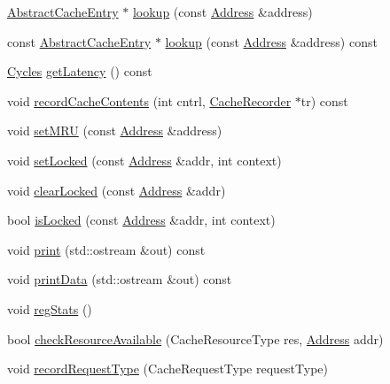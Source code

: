 \begin{DoxyCompactItemize}
\hyperlink{classAbstractCacheEntry}{AbstractCacheEntry} $\ast$ \hyperlink{classCacheMemory_a0c6ae9fa65dfd9c0786e2e5a39be4a1e}{lookup} (const \hyperlink{classAddress}{Address} \&address)
\item 
const \hyperlink{classAbstractCacheEntry}{AbstractCacheEntry} $\ast$ \hyperlink{classCacheMemory_a28b926de4d910367b746eb67d244f250}{lookup} (const \hyperlink{classAddress}{Address} \&address) const 
\item 
\hyperlink{classCycles}{Cycles} \hyperlink{classCacheMemory_ae69a59f28f0cfd099bf798cb6bb76356}{getLatency} () const 
\item 
void \hyperlink{classCacheMemory_aa6672e5328a3421c133ea5590f4b562d}{recordCacheContents} (int cntrl, \hyperlink{classCacheRecorder}{CacheRecorder} $\ast$tr) const 
\item 
void \hyperlink{classCacheMemory_a82f197cef10db015c46d8e9f71275f47}{setMRU} (const \hyperlink{classAddress}{Address} \&address)
\item 
void \hyperlink{classCacheMemory_a046beba265922d99b46eb407d30fa14a}{setLocked} (const \hyperlink{classAddress}{Address} \&addr, int context)
\item 
void \hyperlink{classCacheMemory_abd16aaa7623b6ed38e15bde2b210f88a}{clearLocked} (const \hyperlink{classAddress}{Address} \&addr)
\item 
bool \hyperlink{classCacheMemory_aeb3a7f627af8ca6e8c5f9a878a01ea6f}{isLocked} (const \hyperlink{classAddress}{Address} \&addr, int context)
\item 
void \hyperlink{classCacheMemory_ac55fe386a101fbae38c716067c9966a0}{print} (std::ostream \&out) const 
\item 
void \hyperlink{classCacheMemory_a82b5740a65950cb6ba001dc852567da7}{printData} (std::ostream \&out) const 
\item 
void \hyperlink{classCacheMemory_a4dc637449366fcdfc4e764cdf12d9b11}{regStats} ()
\item 
bool \hyperlink{classCacheMemory_a89094cea0857bcf3a16b429c0b3f8bfe}{checkResourceAvailable} (CacheResourceType res, \hyperlink{classAddress}{Address} addr)
\item 
void \hyperlink{classCacheMemory_a4798ec530ab14c83a290b9d372e31a9d}{recordRequestType} (CacheRequestType requestType)
\end{DoxyCompactItemize}

